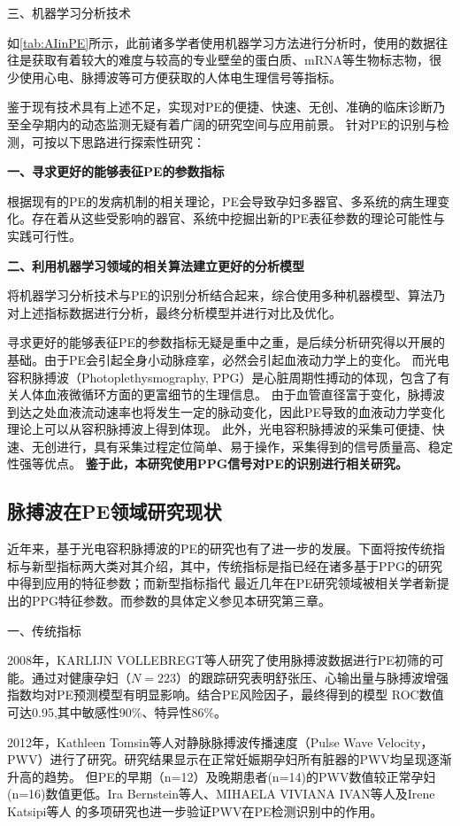 三、机器学习分析技术

如\autoref{tab:AIinPE}所示，此前诸多学者使用机器学习方法进行分析时，使用的数据往往是获取有着较大的难度与较高的专业壁垒的蛋白质、mRNA等生物标志物，很少使用心电、脉搏波等可方便获取的人体电生理信号等指标。

鉴于现有技术具有上述不足，实现对PE的便捷、快速、无创、准确的临床诊断乃至全孕期内的动态监测无疑有着广阔的研究空间与应用前景。
针对PE的识别与检测，可按以下思路进行探索性研究：

\textbf{一、寻求更好的能够表征PE的参数指标}

根据现有的PE的发病机制的相关理论，PE会导致孕妇多器官、多系统的病生理变化。存在着从这些受影响的器官、系统中挖掘出新的PE表征参数的理论可能性与实践可行性。

\textbf{二、利用机器学习领域的相关算法建立更好的分析模型}

将机器学习分析技术与PE的识别分析结合起来，综合使用多种机器模型、算法乃对上述指标数据进行分析，最终分析模型并进行对比及优化。

寻求更好的能够表征PE的参数指标无疑是重中之重，是后续分析研究得以开展的基础。由于PE会引起全身小动脉痉挛，必然会引起血液动力学上的变化。
而光电容积脉搏波（Photoplethysmography, PPG）是心脏周期性搏动的体现，包含了有关人体血液微循环方面的更富细节的生理信息\cite{PPGYY}。
由于血管直径富于变化，脉搏波到达之处血液流动速率也将发生一定的脉动变化，因此PE导致的血液动力学变化理论上可以从容积脉搏波上得到体现。
此外，光电容积脉搏波的采集可便捷、快速、无创进行，具有采集过程定位简单、易于操作，采集得到的信号质量高、稳定性强等优点。
\textbf{鉴于此，本研究使用PPG信号对PE的识别进行相关研究。}

\subsection{脉搏波在PE领域研究现状}
近年来，基于光电容积脉搏波的PE的研究也有了进一步的发展。下面将按传统指标与新型指标两大类对其介绍，其中，传统指标是指已经在诸多基于PPG的研究中得到应用的特征参数；而新型指标指代
最近几年在PE研究领域被相关学者新提出的PPG特征参数。而参数的具体定义参见本研究第三章。

一、传统指标

2008年，KARLIJN VOLLEBREGT等人\cite{KARLIJN2008}研究了使用脉搏波数据进行PE初筛的可能。通过对健康孕妇（$N=223$）的跟踪研究表明舒张压、心输出量与脉搏波增强指数均对PE预测模型有明显影响。结合PE风险因子，最终得到的模型
ROC数值可达0.95,其中敏感性90\%、特异性86\%。

2012年，Kathleen Tomsin等人\cite{Tomsin2012}对静脉脉搏波传播速度（Pulse Wave Velocity，PWV）进行了研究。研究结果显示在正常妊娠期孕妇所有脏器的PWV均呈现逐渐升高的趋势。
但PE的早期（n=12）及晚期患者(n=14)的PWV数值较正常孕妇(n=16)数值更低。Ira Bernstein等人\cite{Ira2014}、MIHAELA VIVIANA IVAN等人\cite{VivianaIvan2018}及Irene Katsipi等人\cite{Katsipi2014}
的多项研究也进一步验证PWV在PE检测识别中的作用。

